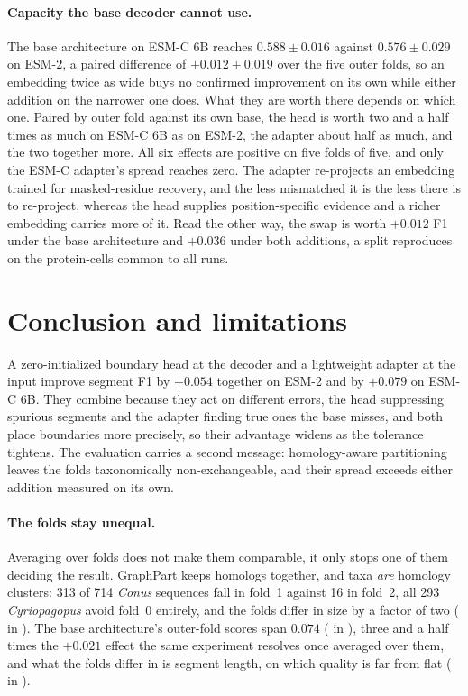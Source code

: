 \documentclass{article}
\begin{document}
\paragraph{Capacity the base decoder cannot use.} The base architecture on ESM-C 6B reaches $0.588\pm0.016$ against $0.576\pm0.029$ on ESM-2, a paired difference of $+0.012\pm0.019$ over the five outer folds, so an embedding twice as wide buys no confirmed improvement on its own while either addition on the narrower one does. What they are worth there depends on which one. Paired by outer fold against its own base, the head is worth two and a half times as much on ESM-C 6B as on ESM-2, the adapter about half as much, and the two together more. All six effects are positive on five folds of five, and only the ESM-C adapter's spread reaches zero. The adapter re-projects an embedding trained for masked-residue recovery, and the less mismatched it is the less there is to re-project, whereas the head supplies position-specific evidence and a richer embedding carries more of it. Read the other way, the swap is worth $+0.012$ F1 under the base architecture and $+0.036$ under both additions, a split  reproduces on the protein-cells common to all runs.

\section{Conclusion and limitations}
\label{sec:conclusion}

A zero-initialized boundary head at the decoder and a lightweight adapter at the input improve
segment F1 by $+0.054$ together on ESM-2 and by $+0.079$ on ESM-C 6B. They combine because they act
on different errors, the head suppressing spurious segments and the adapter finding true ones
the base misses, and both place boundaries more precisely, so their advantage
widens as the tolerance tightens. The evaluation carries a second message: homology-aware
partitioning leaves the folds taxonomically non-exchangeable, and their spread exceeds either
addition measured on its own.

\paragraph{The folds stay unequal.} Averaging over folds does not make them comparable, it only
stops one of them deciding the result. GraphPart keeps homologs together, and taxa \emph{are}
homology clusters: 313 of 714 \emph{Conus} sequences fall in fold~1 against 16 in fold~2, all 293
\emph{Cyriopagopus} avoid fold~0 entirely, and the folds differ in size by a factor of two
( in ). The base architecture's outer-fold scores span $0.074$
( in ), three and a half times the $+0.021$
effect the same experiment resolves once averaged over them, and what the folds differ in is
segment length, on which quality is far from flat ( in ).
\end{document}
